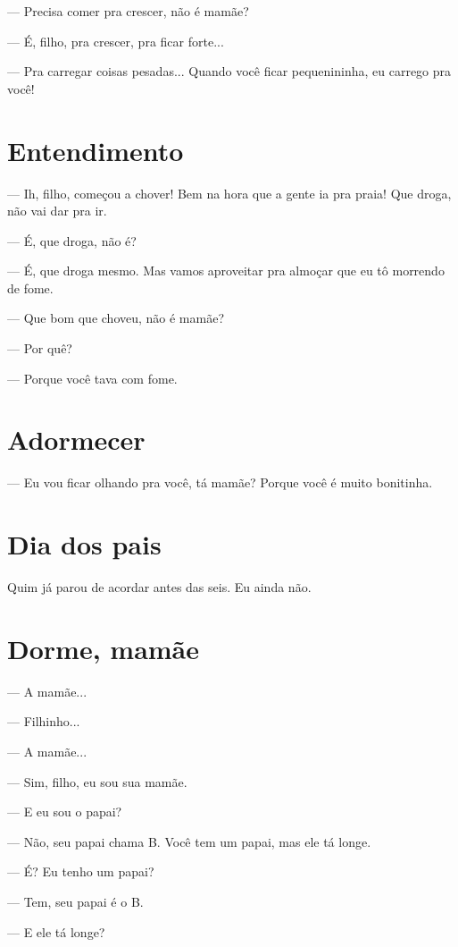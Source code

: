 {{--- Precisa comer pra crescer, não é mamãe?

--- É, filho, pra crescer, pra ficar forte...

--- Pra carregar coisas pesadas... Quando você ficar pequenininha, eu
carrego pra você!

\chapter{Entendimento}\label{entendimento}

--- Ih, filho, começou a chover! Bem na hora que a gente ia pra praia!
Que droga, não vai dar pra ir.

--- É, que droga, não é?

--- É, que droga mesmo. Mas vamos aproveitar pra almoçar que eu tô
morrendo de fome.

--- Que bom que choveu, não é mamãe?

--- Por quê?

--- Porque você tava com fome.

\chapter{Adormecer}\label{adormecer}

--- Eu vou ficar olhando pra você, tá mamãe? Porque você é muito
bonitinha.

\chapter{Dia dos pais}\label{dia-dos-pais}

{Quim já parou de acordar antes das seis. Eu ainda
não.}

\chapter{Dorme, mamãe}\label{dorme-mamuxe3e}

--- A mamãe...

--- Filhinho...

--- A mamãe...

--- Sim, filho, eu sou sua mamãe.

--- E eu sou o papai?

--- Não, seu papai chama B. Você tem um papai, mas ele tá longe.

--- É? Eu tenho um papai?

--- Tem, seu papai é o B.

--- E ele tá longe?

}}

